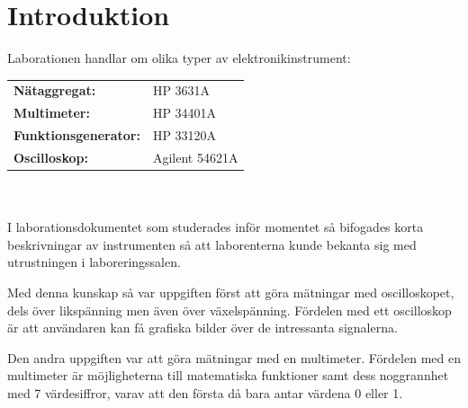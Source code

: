 \documentclass[11pt,a4paper]{article}
\begin{document}
\section{Introduktion}\label{setup}
Laborationen handlar om olika typer av elektronikinstrument:\\
\begin{tabular}{ll}
\rule{0pt}{3ex}\textbf{Nätaggregat:} & HP 3631A\\
\textbf{Multimeter:} & HP 34401A\\
\textbf{Funktionsgenerator:} & HP 33120A\\
\textbf{Oscilloskop:} & Agilent 54621A
\end{tabular}
\\
\\
I laborationsdokumentet som studerades inför momentet så bifogades korta beskrivningar av instrumenten så att laborenterna kunde bekanta sig med utrustningen i laboreringssalen.\\
\par Med denna kunskap så var uppgiften först att göra mätningar med oscilloskopet, dels över likspänning men även över växelspänning. Fördelen med ett oscilloskop är att användaren kan få grafiska bilder över de intressanta signalerna. \par Den andra uppgiften var att göra mätningar med en multimeter. Fördelen med en multimeter är möjligheterna till matematiska funktioner samt dess noggrannhet med 7 värdesiffror, varav att den första då bara antar värdena 0 eller 1.
\end{document}
